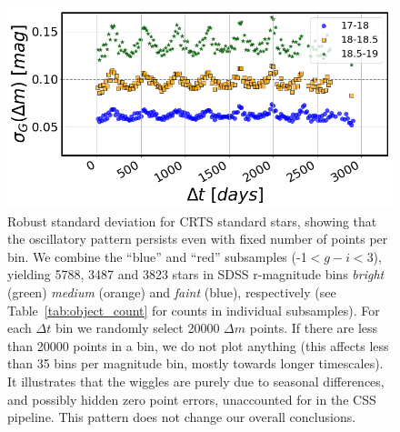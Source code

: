 \documentclass[fleqn,usenatbib]{mnras}
\begin{document}
\begin{figure}
\includegraphics[width=1.0\columnwidth, center]{Fig_B1.png}
\caption{Robust standard deviation for CRTS standard stars, showing that the oscillatory pattern persists even with fixed number of points per bin. We combine the ``blue'' and ``red'' subsamples  (-1$<g-i<$3), yielding 5788, 3487 and 3823 stars in SDSS r-magnitude bins {\it bright} (green)  {\it medium} (orange)  and {\it faint} (blue), respectively (see Table~\ref{tab:object_count} for counts in individual subsamples). For each $\Delta t$  bin we randomly select  20000 $\Delta m$  points. If there are less than 20000 points in a bin, we do not plot anything (this affects less than 35 bins per magnitude bin, mostly towards longer timescales). It illustrates that the wiggles are purely due to  seasonal differences, and possibly hidden zero point errors, unaccounted for in the CSS pipeline. This pattern does not change our overall conclusions. 
\label{fig:CRTSwiggles}} 
\end{figure}


\bsp	%
\label{lastpage}
\end{document}
